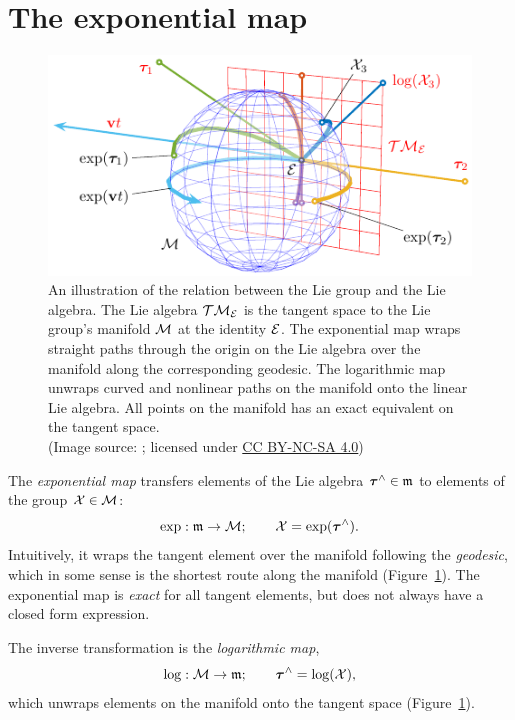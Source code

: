 \section{The exponential map}
\begin{figure}[htb]
    \centering
    \includegraphics[width=0.9\columnwidth]{figures/exponential.pdf}
    \caption{An illustration of the relation between the Lie group and the Lie algebra.
    The Lie algebra $\mathcal{T}\mathcal{M}_{\mathcal{E}}$ is the tangent space to the Lie group's manifold $\mathcal{M}$ at the identity $\mathcal{E}$.
    The exponential map wraps straight paths through the origin on the Lie algebra over the manifold along the corresponding geodesic.
    The logarithmic map unwraps curved and nonlinear paths on the manifold onto the linear Lie algebra.
    All points on the manifold has an exact equivalent on the tangent space.\\
    (Image source: \cite{SolaARobotics}; licensed under \href{https://creativecommons.org/licenses/by-nc-sa/4.0/}{CC BY-NC-SA 4.0})}
    \label{fig:lie-exponential}
\end{figure}
%
The \emph{exponential map} transfers elements of the Lie algebra ${\boldsymbol{\mathbf{\tau}}}^\wedge \in {\mathfrak{m}}$ to elements of the group $\mathcal{X} \in \mathcal{M}$:
\begin{equation}
  \exp: {\mathfrak{m}} \to \mathcal{M}; \quad\quad \mathcal{X} = \exp({\boldsymbol{\mathbf{\tau}}}^\wedge).
\end{equation}
Intuitively, it wraps the tangent element over the manifold following the \emph{geodesic}, which in some sense is the shortest route along the manifold (Figure~\ref{fig:lie-exponential}).
The exponential map is \emph{exact} for all tangent elements, but does not always have a closed form expression.

The inverse transformation is the \emph{logarithmic map},
\begin{equation}
  \log: \mathcal{M} \to {\mathfrak{m}}; \quad\quad {\boldsymbol{\mathbf{\tau}}}^\wedge = \log(\mathcal{X}),
\end{equation}
which unwraps elements on the manifold onto the tangent space (Figure~\ref{fig:lie-exponential}).

